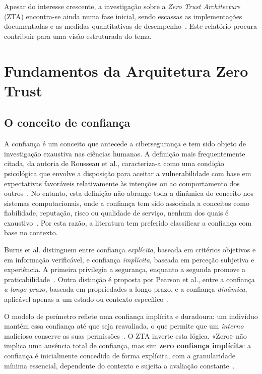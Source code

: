 \documentclass{llncs}
\begin{document}
Apesar do interesse crescente, a investigação sobre a \textit{Zero Trust Architecture}
(ZTA) encontra-se ainda numa fase inicial, sendo escassas as implementações
documentadas e as medidas quantitativas de desempenho~\cite{fernandez2024}. Este
relatório procura contribuir para uma visão estruturada do tema.

\section{Fundamentos da Arquitetura Zero Trust}

\subsection{O conceito de confiança}
A confiança é um conceito que antecede a cibersegurança e tem sido objeto de investigação exaustiva nas
ciências humanas. A definição mais frequentemente citada, da autoria de Rousseau et al., caracteriza-a como uma
condição psicológica que envolve a disposição para aceitar a vulnerabilidade com base em
expectativas favoráveis relativamente às intenções ou ao comportamento dos outros~\cite{rousseau1998}.
No entanto, esta definição não abrange toda a dinâmica do conceito nos
sistemas computacionais, onde a confiança tem sido associada a conceitos como fiabilidade,
reputação, risco ou qualidade de serviço, nenhum dos quais é exaustivo~\cite{govindan2011}.
Por esta razão, a literatura tem preferido classificar a confiança com base no contexto.

Burns et al. distinguem entre confiança \textit{explícita}, baseada em critérios objetivos
e em informação verificável, e confiança \textit{implícita}, baseada em
perceção subjetiva e experiência. A primeira privilegia a segurança, enquanto a segunda promove
a praticabilidade~\cite{burns2006}. Outra distinção é proposta por Pearson et al., entre
a confiança \textit{a longo prazo}, baseada em propriedades a longo prazo, e
a confiança \textit{dinâmica}, aplicável apenas a um estado ou contexto específico~\cite{pearson2005}.

O modelo de perímetro reflete uma confiança implícita e duradoura: um indivíduo
mantém essa confiança até que seja reavaliada, o que permite que um \textit{interno} malicioso
conserve as suas permissões~\cite{kang2023}. O ZTA inverte esta lógica. «Zero»
não implica uma ausência total de confiança, mas sim \textbf{zero confiança implícita}:
a confiança é inicialmente concedida de forma explícita, com a granularidade mínima
essencial, dependente do contexto e sujeita a avaliação constante~\cite{kang2023}.
\end{document}
